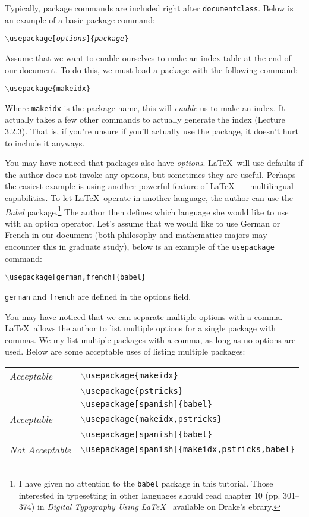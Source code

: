 \documentclass{article}
\begin{document}
Typically, package commands are included right after \texttt{documentclass}. Below is an example of a basic package command:
\begin{center}
\texttt{$\backslash$usepackage[\textit{options}]\{\textit{package}\}}
\end{center}

Assume that we want to enable ourselves to make an index table at the end of our document. To do this, we must load a package with the following command:
\begin{center}
\texttt{$\backslash$usepackage\{makeidx\}}
\end{center}
Where \texttt{makeidx} is the package name, this will \emph{enable} us to make an index. It actually takes a few other commands to actually generate the index (Lecture 3.2.3). That is, if you're unsure if you'll actually use the package, it doesn't hurt to include it anyways.

You may have noticed that packages also have \textit{options}. \LaTeX\ will use defaults if the author does not invoke any options, but sometimes they are useful. Perhaps the easiest example is using another powerful feature of \LaTeX\ --- multilingual capabilities. To let \LaTeX\ operate in another language, the author can use the \textit{Babel} package.\footnote{I have given no attention to the \texttt{babel} package in this tutorial. Those interested in typesetting in other languages should read chapter 10 (pp. 301--374) in \textit{Digital Typography Using \LaTeX\ } available on Drake's ebrary.} The author then defines which language she would like to use with an option operator. Let's assume that we would like to use German or French in our document (both philosophy and mathematics majors may encounter this in graduate study), below is an example of the \texttt{usepackage} command:
\begin{center}
\texttt{$\backslash$usepackage[german,french]\{\texttt{babel}\}}
\end{center}
\texttt{german} and \texttt{french} are defined in the options field.

You may have noticed that we can separate multiple options with a comma. \LaTeX\ allows the author to list multiple options for a single package with commas. We my list multiple packages with a comma, as long as no options are used. Below are some acceptable uses of listing multiple packages:
\begin{center}
	\begin{tabular}{l l}
		\textit{Acceptable} & \texttt{$\backslash$usepackage\{makeidx\}} \\
												& \texttt{$\backslash$usepackage\{pstricks\}} \\
												& \texttt{$\backslash$usepackage[spanish]\{babel\}} \\
		\textit{Acceptable} & \texttt{$\backslash$usepackage\{makeidx,pstricks\}} \\
												& \texttt{$\backslash$usepackage[spanish]\{babel\}} \\
		\textit{Not Acceptable} & \texttt{$\backslash$usepackage[spanish]\{makeidx,pstricks,babel\}} \\
	\end{tabular}
\end{center}
\end{document}
